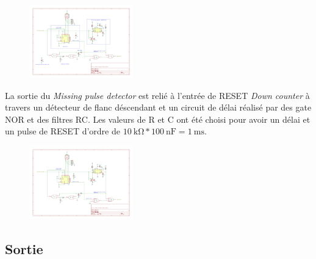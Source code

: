 \documentclass[french]{layout/Report}
\begin{document}
\begin{description}[leftmargin=!,labelwidth=4cm, labelindent=\parindent]
        \begin{figure}[H]
            \centering
            \includegraphics[width=0.4\textwidth]{fig/decoder_output_logic.pdf}
        \end{figure}

        La sortie du \textit{Missing pulse detector} est relié à l'entrée de RESET \textit{Down counter}
        à travers un détecteur de flanc déscendant et un circuit de délai réalisé par des gate NOR et des filtres RC.
        Les valeurs de R et C ont été choisi pour avoir un délai et un pulse de RESET d'ordre de $\SI{10}{\kilo\ohm}*\SI{100}{\nano\farad} = \SI{1}{\milli\second}$.
        \begin{figure}[H]
            \centering
            \includegraphics[width=0.4\textwidth]{fig/decoder_reset_delay.pdf}
        \end{figure}

\end{description}

\subsection{Sortie}
\end{document}
